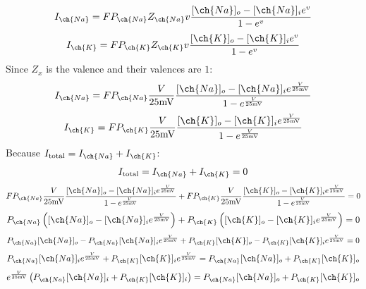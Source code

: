 \documentclass[11pt]{article}
\begin{document}
\begin{enumerate}[label=\arabic*.]
\begin{enumerate}[label=(\alph*)]
\begin{align*}
I_{\ch{Na}} = F P_{\ch{Na}} Z_{\ch{Na}} v \frac{[\ch{Na}]_o - [\ch{Na}]_i e^v} {1 - e^v}
\end{align*}
\begin{align*}
I_{\ch{K}} = F P_{\ch{K}} Z_{\ch{K}} v \frac{[\ch{K}]_o - [\ch{K}]_i e^v} {1 - e^v}
\end{align*}
Since $Z_x$ is the valence and their valences are $1$:
\begin{align*}
I_{\ch{Na}} = F P_{\ch{Na}} \frac{V} {25 \text{mV}} \frac{[\ch{Na}]_o - [\ch{Na}]_i e^{\frac{V} {25 \text{mV}}}} {1 - e^{\frac{V} {25 \text{mV}}}}
\end{align*}
\begin{align*}
I_{\ch{K}} = F P_{\ch{K}} \frac{V} {25 \text{mV}} \frac{[\ch{K}]_o - [\ch{K}]_i e^{\frac{V} {25 \text{mV}}}} {1 - e^{\frac{V} {25 \text{mV}}}}
\end{align*}
Because $I_{\text{total}} = I_{\ch{Na}} + I_{\ch{K}}$:
\begin{align*}
I_{\text{total}} = I_{\ch{Na}} + I_{\ch{K}} = 0
\end{align*}
\begin{align*}
F P_{\ch{Na}} \frac{V} {25 \text{mV}} \frac{[\ch{Na}]_o - [\ch{Na}]_i e^{\frac{V} {25 \text{mV}}}} {1 - e^{\frac{V} {25 \text{mV}}}} + F P_{\ch{K}} \frac{V} {25 \text{mV}} \frac{[\ch{K}]_o - [\ch{K}]_i e^{\frac{V} {25 \text{mV}}}} {1 - e^{\frac{V} {25 \text{mV}}}} = 0
\end{align*}
\begin{align*}
P_{\ch{Na}} \left([\ch{Na}]_o - [\ch{Na}]_i e^{\frac{V} {25 \text{mV}}}\right) + P_{\ch{K}} \left([\ch{K}]_o - [\ch{K}]_i e^{\frac{V} {25 \text{mV}}}\right) = 0
\end{align*}
\begin{align*}
P_{\ch{Na}} [\ch{Na}]_o - P_{\ch{Na}} [\ch{Na}]_i e^{\frac{V} {25 \text{mV}}} + P_{\ch{K}} [\ch{K}]_o - P_{\ch{K}} [\ch{K}]_i e^{\frac{V} {25 \text{mV}}} = 0
\end{align*}
\begin{align*}
P_{\ch{Na}} [\ch{Na}]_i e^{\frac{V} {25 \text{mV}}} + P_{\ch{K}} [\ch{K}]_i e^{\frac{V} {25 \text{mV}}} = P_{\ch{Na}} [\ch{Na}]_o + P_{\ch{K}} [\ch{K}]_o
\end{align*}
\begin{align*}
e^{\frac{V} {25 \text{mV}}} \left(P_{\ch{Na}} [\ch{Na}]_i  + P_{\ch{K}} [\ch{K}]_i\right) = P_{\ch{Na}} [\ch{Na}]_o + P_{\ch{K}} [\ch{K}]_o
\end{align*}
\begin{align*}

\end{align*}
\end{enumerate}
\end{enumerate}
\end{document}
